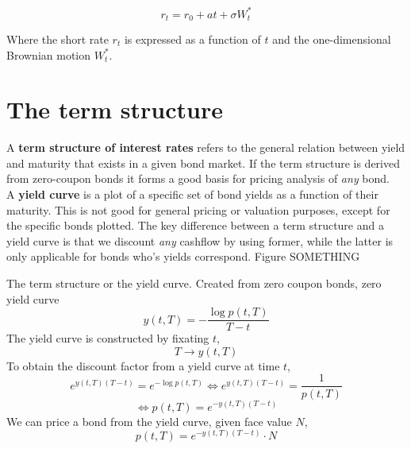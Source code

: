 \documentclass[11pt,a4paper]{article}
\numberwithin{equation}{section}
\begin{document}
        \[
        r_t = r_0 + at + \sigma W^{*}_{t}
        \]
        
        Where the short rate $r_t$ is expressed as a function of $t$ and the one-dimensional Brownian motion $W^{*}_{t}$.

	\section{The term structure}

	A \textbf{term structure of interest rates} refers to the general relation between yield and maturity that exists in a given bond market. If the term structure is derived from zero-coupon bonds it forms a good basis for pricing analysis of \emph{any} bond.\\

	A \textbf{yield curve} is a plot of a specific set of bond yields as a function of their maturity. This is not good for general pricing or valuation purposes, except for the specific bonds plotted. The key difference between a term structure and a yield curve is that we discount \emph{any} cashflow by using former, while the latter is only applicable for bonds who's yields correspond. Figure SOMETHING

	The term structure or the yield curve.
	Created from zero coupon bonds, zero yield curve
	\[
	y(t,T)=-\frac{\log{p(t,T)}}{T-t}
	\]
	The yield curve is constructed by fixating $t$,
	\[
	T\to y(t,T)
	\]
	To obtain the discount factor from a yield curve at time $t$,
	\[
	e^{y(t,T)(T-t)}=e^{-\log{p(t,T)}}\iff e^{y(t,T)(T-t)}=\frac{1}{p(t,T)}
	\]
	\[
	\iff p(t,T)=e^{-y(t,T)(T-t)}
	\]
	We can price a bond from the yield curve, given face value $N$,
	\[
	p(t,T)=e^{-y(t,T)(T-t)}\cdot N
	\]
\end{document}
